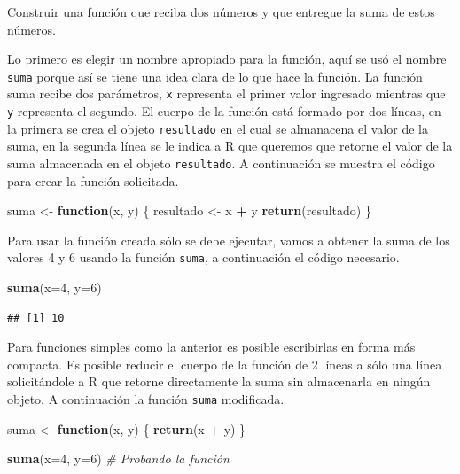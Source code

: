 \documentclass[10pt,]{krantz}
\makeatletter
\newenvironment{Shaded}{\begin{snugshade}}{\end{snugshade}}
\newcommand{\KeywordTok}[1]{\textcolor[rgb]{0.13,0.29,0.53}{\textbf{#1}}}
\newcommand{\DataTypeTok}[1]{\textcolor[rgb]{0.13,0.29,0.53}{#1}}
\newcommand{\DecValTok}[1]{\textcolor[rgb]{0.00,0.00,0.81}{#1}}
\newcommand{\StringTok}[1]{\textcolor[rgb]{0.31,0.60,0.02}{#1}}
\newcommand{\CommentTok}[1]{\textcolor[rgb]{0.56,0.35,0.01}{\textit{#1}}}
\newcommand{\ControlFlowTok}[1]{\textcolor[rgb]{0.13,0.29,0.53}{\textbf{#1}}}
\newcommand{\OperatorTok}[1]{\textcolor[rgb]{0.81,0.36,0.00}{\textbf{#1}}}
\newcommand{\NormalTok}[1]{#1}
\newenvironment{kframe}{%
\medskip{}
\setlength{\fboxsep}{.8em}
 \def\at@end@of@kframe{}%
 \ifinner\ifhmode%
  \def\at@end@of@kframe{\end{minipage}}%
  \begin{minipage}{\columnwidth}%
 \fi\fi%
 \def\FrameCommand##1{\hskip\@totalleftmargin \hskip-\fboxsep
 \colorbox{shadecolor}{##1}\hskip-\fboxsep
     \hskip-\linewidth \hskip-\@totalleftmargin \hskip\columnwidth}%
 \MakeFramed {\advance\hsize-\width
   \@totalleftmargin\z@ \linewidth\hsize
   \@setminipage}}%
 {\par\unskip\endMakeFramed%
 \at@end@of@kframe}
\renewenvironment{Shaded}{\begin{kframe}}{\end{kframe}}
\makeatother
\begin{document}
Construir una función que reciba dos números y que entregue la suma de
estos números.

Lo primero es elegir un nombre apropiado para la función, aquí se usó el
nombre \texttt{suma} porque así se tiene una idea clara de lo que hace
la función. La función suma recibe dos parámetros, \texttt{x} representa
el primer valor ingresado mientras que \texttt{y} representa el segundo.
El cuerpo de la función está formado por dos líneas, en la primera se
crea el objeto \texttt{resultado} en el cual se almanacena el valor de
la suma, en la segunda línea se le indica a R que queremos que retorne
el valor de la suma almacenada en el objeto \texttt{resultado}. A
continuación se muestra el código para crear la función solicitada.

\begin{Shaded}
\begin{Highlighting}[]
\NormalTok{suma <-}\StringTok{ }\ControlFlowTok{function}\NormalTok{(x, y) \{}
\NormalTok{  resultado <-}\StringTok{ }\NormalTok{x }\OperatorTok{+}\StringTok{ }\NormalTok{y}
  \KeywordTok{return}\NormalTok{(resultado)}
\NormalTok{\}}
\end{Highlighting}
\end{Shaded}

Para usar la función creada sólo se debe ejecutar, vamos a obtener la
suma de los valores 4 y 6 usando la función \texttt{suma}, a
continuación el código necesario.

\begin{Shaded}
\begin{Highlighting}[]
\KeywordTok{suma}\NormalTok{(}\DataTypeTok{x=}\DecValTok{4}\NormalTok{, }\DataTypeTok{y=}\DecValTok{6}\NormalTok{)}
\end{Highlighting}
\end{Shaded}

\begin{verbatim}
## [1] 10
\end{verbatim}

Para funciones simples como la anterior es posible escribirlas en forma
más compacta. Es posible reducir el cuerpo de la función de 2 líneas a
sólo una línea solicitándole a R que retorne directamente la suma sin
almacenarla en ningún objeto. A continuación la función \texttt{suma}
modificada.

\begin{Shaded}
\begin{Highlighting}[]
\NormalTok{suma <-}\StringTok{ }\ControlFlowTok{function}\NormalTok{(x, y) \{}
  \KeywordTok{return}\NormalTok{(x }\OperatorTok{+}\StringTok{ }\NormalTok{y)}
\NormalTok{\}}

\KeywordTok{suma}\NormalTok{(}\DataTypeTok{x=}\DecValTok{4}\NormalTok{, }\DataTypeTok{y=}\DecValTok{6}\NormalTok{)  }\CommentTok{# Probando la función}
\end{Highlighting}
\end{Shaded}
\end{document}
